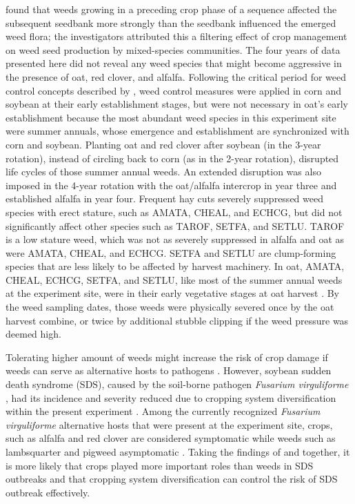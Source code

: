 \documentclass[
]{article}
\begin{document}
\citet{ryanManagementFiltersSpecies2010} found that weeds growing in a preceding crop phase of a sequence affected the subsequent seedbank more strongly than the seedbank influenced the emerged weed flora; the investigators attributed this a filtering effect of crop management on weed seed production by mixed-species communities. The four years of data presented here did not reveal any weed species that might become aggressive in the presence of oat, red clover, and alfalfa. Following the critical period for weed control concepts described by \citet{knezevicCriticalPeriodWeed2002}, weed control measures were applied in corn and soybean at their early establishment stages, but were not necessary in oat's early establishment because the most abundant weed species in this experiment site were summer annuals, whose emergence and establishment are synchronized with corn and soybean. Planting oat and red clover after soybean (in the 3-year rotation), instead of circling back to corn (as in the 2-year rotation), disrupted life cycles of those summer annual weeds. An extended disruption was also imposed in the 4-year rotation with the oat/alfalfa intercrop in year three and established alfalfa in year four. Frequent hay cuts severely suppressed weed species with erect stature, such as AMATA, CHEAL, and ECHCG, but did not significantly affect other species such as TAROF, SETFA, and SETLU. TAROF is a low stature weed, which was not as severely suppressed in alfalfa and oat as were AMATA, CHEAL, and ECHCG. SETFA and SETLU are clump-forming species that are less likely to be affected by harvest machinery. In oat, AMATA, CHEAL, ECHCG, SETFA, and SETLU, like most of the summer annual weeds at the experiment site, were in their early vegetative stages at oat harvest \citep{buhlerEmergencePersistenceSeed2001, cordeauHowWeedsDiffer2017}. By the weed sampling dates, those weeds were physically severed once by the oat harvest combine, or twice by additional stubble clipping if the weed pressure was deemed high.

Tolerating higher amount of weeds might increase the risk of crop damage if weeds can serve as alternative hosts to pathogens \citep{wislerInteractionsWeedsCultivated2005, mohlerCropDiseasePathogens2009}. However, soybean sudden death syndrome (SDS), caused by the soil-borne pathogen \emph{Fusarium virguliforme} \citep{hartmanResearchAdvancesManagement2015}, had its incidence and severity reduced due to cropping system diversification within the present experiment \citep{leandroCroppingSystemDiversification2018}. Among the currently recognized \emph{Fusarium virguliforme} alternative hosts that were present at the experiment site, crops, such as alfalfa and red clover are considered symptomatic while weeds such as lambsquarter and pigweed asymptomatic \citep{kolanderSymptomaticAsymptomaticHost2012}. Taking the findings of \citet{kolanderSymptomaticAsymptomaticHost2012} and \citet{leandroCroppingSystemDiversification2018} together, it is more likely that crops played more important roles than weeds in SDS outbreaks and that cropping system diversification can control the risk of SDS outbreak effectively.
\end{document}
